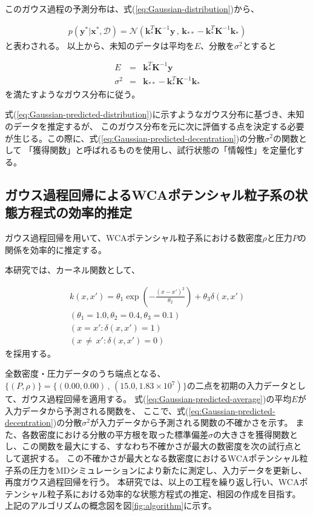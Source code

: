 \documentclass[titlepage]{jsreport}
\begin{document}
{{{このガウス過程の予測分布は、式(\ref{eq:Gaussian-distribution})から、

\large
\begin{eqnarray}
p(\bm{y}^*|\bm{x}^*,\mathcal{D})
={\mathcal{N}}(\bm{k}_*^T\bm{K}^{-1}\bm{y}\,,\,\bm{k}_{**}-\bm{k}_*^T\bm{K}^{-1}\bm{k}_*)  \label{eq:Gaussian-predicted-distribution}
\end{eqnarray}
\normalsize
と表わされる。
以上から、未知のデータは平均を$E$、分散を$\sigma^2$とすると

\large
\begin{eqnarray}
    E&=&\bm{k}_*^T\bm{K}^{-1}\bm{y}\label{eq:Gaussian-predicted-average} \\
    \sigma^2&=&\bm{k}_{**}-\bm{k}_*^T\bm{K}^{-1}\bm{k}_* \label{eq:Gaussian-predicted-decentration}
\end{eqnarray}
\normalsize
を満たすようなガウス分布に従う\cite{Gauss-machine-learning}。

式(\ref{eq:Gaussian-predicted-distribution})に示すようなガウス分布に基づき、未知のデータを推定するが、
このガウス分布を元に次に評価する点を決定する必要が生じる。この際に、式(\ref{eq:Gaussian-predicted-decentration})の分散$\sigma^2$の関数として
「獲得関数」と呼ばれるものを使用し、試行状態の「情報性」を定量化する\cite{acquisition-function}。


\subsection{ガウス過程回帰によるWCAポテンシャル粒子系の状態方程式の効率的推定}\label{method-subsec:Gaussian-estimation}
ガウス過程回帰を用いて、WCAポテンシャル粒子系における数密度$\rho$と圧力$P$の関係を効率的に推定する。

本研究では、カーネル関数として、

\large
\begin{eqnarray}
    k(x,x')=\theta_1\exp\left(-\frac{(x-x')^2}{\theta_2}\right)+\theta_3\delta(x,x')\\ \label{eq:Gauss-kernel}
    (\theta_1=1.0,\theta_2=0.4,\theta_3=0.1) \nonumber \\ 
    (x=x':\delta(x,x')=1) \nonumber \\
    (x\,{\neq}\,x':\delta(x,x')=0) \nonumber
\end{eqnarray}
\normalsize
を採用する\cite{Gauss-machine-learning}。

全数密度・圧力データのうち端点となる、
$\{(P,\rho)\}=\{(0.00,0.00)\,,\,(15.0,1.83×10^7)\}$の二点を初期の入力データとして、ガウス過程回帰を適用する。
式(\ref{eq:Gaussian-predicted-average})の平均$E$が入力データから予測される関数を、
ここで、式(\ref{eq:Gaussian-predicted-decentration})の分散$\sigma^2$が入力データから予測される関数の不確かさを示す。
また、各数密度における分散の平方根を取った標準偏差$\sigma$の大きさを獲得関数とし、この関数を最大にする、すなわち不確かさが最大の数密度を次の試行点として選択する。
この不確かさが最大となる数密度におけるWCAポテンシャル粒子系の圧力をMDシミュレーションにより新たに測定し、入力データを更新し、再度ガウス過程回帰を行う。
本研究では、以上の工程を繰り返し行い、WCAポテンシャル粒子系における効率的な状態方程式の推定、相図の作成を目指す。
上記のアルゴリズムの概念図を図\ref{fig:algorithm}に示す。

}}}
\end{document}
